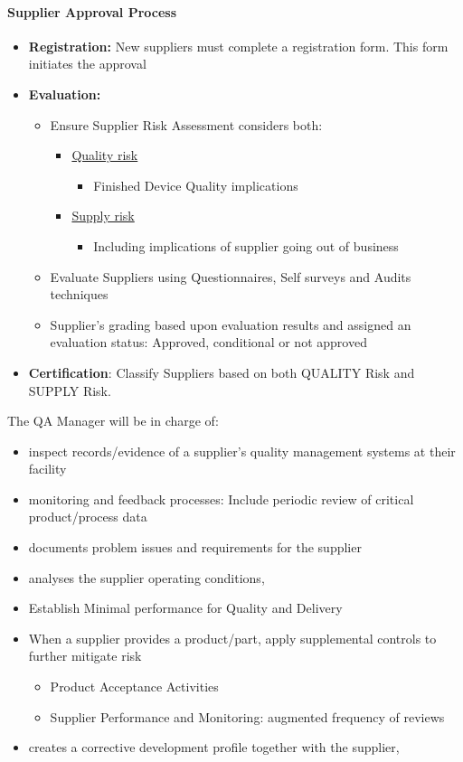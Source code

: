 \documentclass{template/openetcs_article}
\begin{document}
\paragraph{Supplier Approval Process}
\begin{itemize}
\item \textbf{Registration:} New suppliers must complete a registration form. This form initiates the approval 
\item \textbf{Evaluation:} 
\begin{itemize}
\item Ensure Supplier Risk Assessment considers both:
\begin{itemize}
\item \underline{Quality risk}
\begin{itemize}
\item Finished Device Quality implications
\end{itemize}
\item \underline{Supply risk}
\begin{itemize}
\item Including implications of supplier going out of business
\end{itemize}
\end{itemize}
\item Evaluate Suppliers using Questionnaires, Self surveys and Audits techniques
\item Supplier’s grading based upon evaluation results and assigned an evaluation status: Approved, conditional or not approved
\end{itemize}
\item \textbf{Certification}: Classify Suppliers based on both QUALITY Risk and SUPPLY Risk.
\end{itemize}

The QA Manager will be in charge of:
\begin{itemize}
\item inspect records/evidence of a supplier’s quality management systems at their facility
\item monitoring and feedback processes: Include periodic review of critical product/process data
\item documents problem issues and requirements for the supplier
\item analyses the supplier operating conditions,
\item Establish Minimal performance for Quality and Delivery
\item When a supplier provides a product/part, apply supplemental controls to further mitigate risk 
\begin{itemize}
\item Product Acceptance Activities
\item Supplier Performance and Monitoring: augmented frequency of reviews
\end{itemize}
\item creates a corrective development profile together with the supplier,
\end{itemize}
\end{document}
